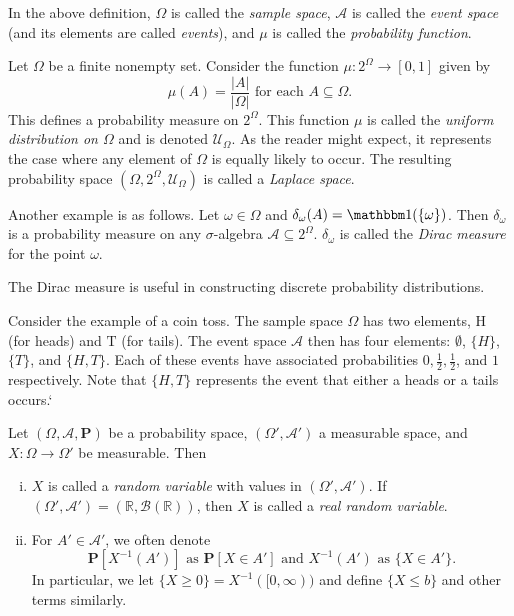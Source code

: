In the above definition, $\Omega$ is called the \textit{sample space}, $\mathcal{A}$ is called the \textit{event space} (and its elements are called \textit{events}), and $\mu$ is called the \textit{probability function}.

\vspace{2mm}
Let $\Omega$ be a finite nonempty set. Consider the function $\mu:2^\Omega\to[0,1]$ given by
$$\mu(A)=\frac{|A|}{|\Omega|}\text{ for each $A\subseteq\Omega$.}$$
This defines a probability measure on $2^\Omega$. This function $\mu$ is called the \textit{uniform distribution on $\Omega$} and is denoted $\mathcal{U}_\Omega$. As the reader might expect, it represents the case where any element of $\Omega$ is equally likely to occur. The resulting probability space $(\Omega,2^\Omega,\mathcal{U}_\Omega)$ is called a \textit{Laplace space}.

\vspace{2mm}
Another example is as follows. Let $\omega\in\Omega$ and $\delta_\omega(A)=\indic(\{\omega\})$. Then $\delta_\omega$ is a probability measure on any $\sigma$-algebra $\mathcal{A}\subseteq2^\Omega$. $\delta_\omega$ is called the \textit{Dirac measure} for the point $\omega$.

The Dirac measure is useful in constructing discrete probability distributions.

\vspace{2mm}
Consider the example of a coin toss. The sample space $\Omega$ has two elements, $\text{H}$ (for heads) and $\text{T}$ (for tails). The event space $\mathcal{A}$ then has four elements: $\emptyset$, $\{H\}$, $\{T\}$, and $\{H,T\}$. Each of these events have associated probabilities $0,\frac{1}{2},\frac{1}{2}$, and $1$ respectively. Note that $\{H,T\}$ represents the event that either a heads or a tails occurs.`

\begin{definition}
    Let $(\Omega,\mathcal{A},\textbf{P})$ be a probability space, $(\Omega',\mathcal{A}')$ a measurable space, and $X:\Omega\to\Omega'$ be measurable. Then
    \begin{enumerate}[(i)]
        \item $X$ is called a \textit{random variable} with values in $(\Omega',\mathcal{A}')$. If $(\Omega',\mathcal{A}')=(\mathbb{R},\mathcal{B}(\mathbb{R}))$, then $X$ is called a \textit{real random variable}.
        
        \item For $A'\in\mathcal{A}'$, we often denote
        $$\textbf{P}[X^{-1}(A')]\text{ as }\textbf{P}[X\in A']\text{ and } X^{-1}(A')\text{ as }\{X\in A'\}.$$
        In particular, we let $\{X\geq 0\}=X^{-1}([0,\infty))$ and define $\{X\leq b\}$ and other terms similarly.
    \end{enumerate}
\end{definition}

